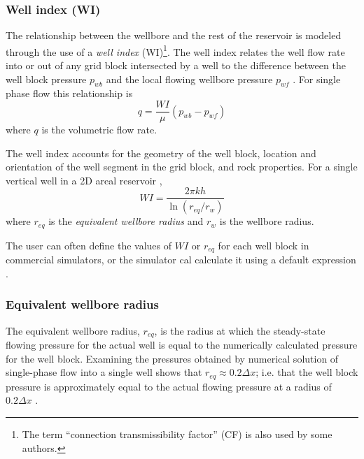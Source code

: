 \subsubsection{Well index (WI)} %
\label{ssub:well_index_}

The relationship between the wellbore and the rest of the reservoir is modeled through the use of a \emph{well index} (WI)\footnote{The term ``connection transmissibility factor'' (CF) is also used by some authors\cite{Peaceman2003New,Schlumberger2013Eclipse}.}. The well index relates the well flow rate into or out of any grid block intersected by a well to the difference between the well block pressure $p_{wb}$ and the local flowing wellbore pressure $p_{wf}$ \cite{Wolfsteiner2003Calculation}. For single phase flow this relationship is
\begin{equation}
    \label{eq:wolfsteiner-well-index-multiple-blocks}
    q = \frac{WI}{\mu} \left( p_{wb} - p_{wf} \right)
\end{equation}
where $q$ is the volumetric flow rate.

The well index accounts for the geometry of the well block, location and orientation of the well segment in the grid block, and rock properties. For a single vertical well in a 2D areal reservoir \cite{Peaceman2003New},
\begin{equation}
    \label{eq:well-index-intro}
    WI = \frac{2\pi kh}{\ln \left(r_{eq}/r_{w}\right)}
\end{equation}
where $r_{eq}$ is the \emph{equivalent wellbore radius} and $r_w$ is the wellbore radius.

The user can often define the values of $WI$ or $r_{eq}$ for each well block in commercial simulators, or the simulator cal calculate it using a default expression \cite{Peaceman2003New}.

\subsubsection{Equivalent wellbore radius} %
\label{ssub:equivalent_wellbore_radius}
The equivalent wellbore radius, $r_{eq}$, is the radius at which the steady-state flowing pressure for the actual well is equal to the numerically calculated pressure for the well block. Examining the pressures obtained by numerical solution of single-phase flow into a single well shows that $r_{eq} \approx 0.2 \Delta x$; i.e. that the well block pressure is approximately equal to the actual flowing pressure at a radius of $0.2 \Delta x$ \cite{Peaceman1978Interpretation}.

